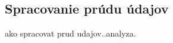 \subsection{Spracovanie prúdu údajov}
\label{Spracovanie prúdu údajov}
ako spracovat prud udajov..analyza.